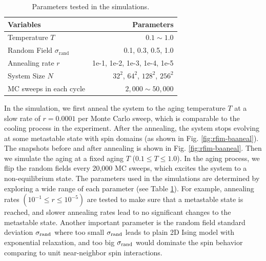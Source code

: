 \begin{table}[h!]
\begin{center}
\begin{tabular}{l | r}
Variables              & Parameters \\
\hline
Temperature $T$ 	& 	$0.1 \sim 1.0$   \\
Random Field $\sigma_\text{rand}$            &		 0.1, 0.3, 0.5, 1.0   \\
Annealing rate $r$          & 	1e-1, 1e-2, 1e-3, 1e-4, 1e-5   \\
System Size $N$ 	&	  $32^2$, $64^2$, $128^2$, $256^2$   \\
MC sweeps in each cycle  	&	  $2,000 \sim 50,000$   \\
\end{tabular}
\end{center}
\caption{Parameters tested in the simulations.}
\label{table:rfim-paras}
\end{table}

In the simulation, we first anneal the system to the aging temperature $T$ at a slow rate of $r=0.0001$ per Monte Carlo sweep, which is comparable to the cooling process in the experiment. After the annealing, the system stops evolving at some metastable state with spin domains (as shown in Fig. \ref{fig:rfim-baaneal}). The snapshots before and after annealing is shown in Fig. \ref{fig:rfim-baaneal}. Then we simulate the aging at a fixed aging $T$ ($0.1\le T \le 1.0$). In the aging process, we flip the random fields every 20,000 MC sweeps, which excites the system to a non-equilibrium state. The parameters used in the simulations are determined by exploring a wide range of each parameter (see Table \ref{table:rfim-paras}). For example, annealing rates $\left( 10^{-1} \le r \le 10^{-5}\right)$ are tested to make sure that a metastable state is reached, and slower annealing rates lead to no significant changes to the metastable state. Another important parameter is the random field standard deviation $\sigma_{\rm rand}$ where too small $\sigma_{\rm rand}$ leads to plain 2D Ising model with exponential relaxation, and too big $\sigma_{\rm rand}$ would dominate the spin behavior comparing to unit near-neighbor spin interactions. 


